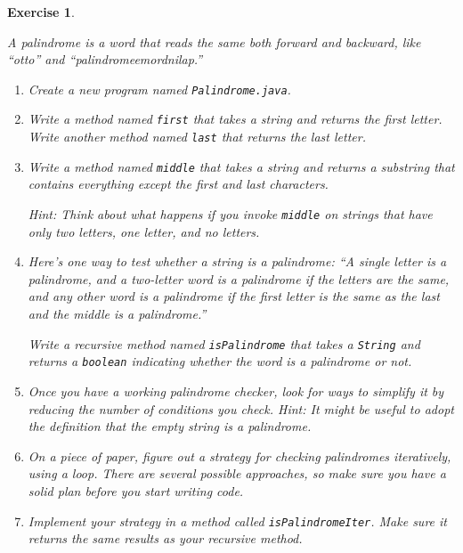 \documentclass[12pt]{book}
\theoremstyle{exercise}
\newtheorem{exercise}{Exercise}[chapter]
\newcommand{\java}[1]{\verb"#1"}
\newcommand{\java}[1]{\lstinline{#1}} %
\begin{document}
\begin{exercise}
\label{palindrome}

A palindrome is a word that reads the same both forward and backward, like ``otto'' and ``palindromeemordnilap.''

\begin{enumerate}

\item Create a new program named {\tt Palindrome.java}.

\item Write a method named \java{first} that takes a string and returns the first letter.
Write another method named \java{last} that returns the last letter.

\item Write a method named \java{middle} that takes a string and returns a substring that contains everything {\em except} the first and last characters.


Hint: Think about what happens if you invoke \java{middle} on strings that have only two letters, one letter, and no letters.

\item Here's one way to test whether a string is a palindrome:
``A single letter is a palindrome, and a two-letter word is a palindrome if the letters are the same, and any other word is a palindrome if the first letter is the same as the last and the middle is a palindrome.''

Write a recursive method named \java{isPalindrome} that takes a \java{String} and returns a \java{boolean} indicating whether the word is a palindrome or not.

\item Once you have a working palindrome checker, look for ways to simplify it by reducing the number of conditions you check.
Hint: It might be useful to adopt the definition that the empty string is a palindrome.

\item On a piece of paper, figure out a strategy for checking palindromes iteratively, using a loop.
There are several possible approaches, so make sure you have a solid plan before you start writing code.

\item Implement your strategy in a method called \java{isPalindromeIter}.
Make sure it returns the same results as your recursive method.


\end{enumerate}

\end{exercise}
\end{document}
